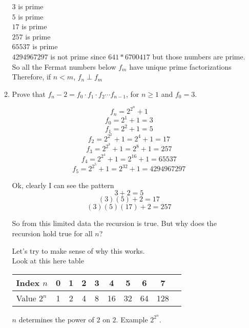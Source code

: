 \documentclass[10pt, AMS Euler]{article}
\begin{document}
\begin{enumerate}
\begin{enumerate}
                $3$ is prime \\
                $5$ is prime \\
                $17$ is prime \\
                $257$ is prime \\
                $65537$ is prime \\
                $4294967297$ is not prime since $641 * 6700417$ but those numbers are prime. \\

                So all the Fermat numbers below $f_m$ have unique prime factorizations \\

                Therefore, if $n < m$, $f_n \perp f_m$ \\

			\item Prove that $f_n - 2 = f_0\cdot f_1 \cdot f_2 \cdots f_{n-1}$, for $n \geq 1$ and  $f_0 = 3$.

                $$ f_n = 2^{2^n}+1 $$
                $$ f_0 = 2^{1} + 1 = 3 $$
                $$ f_1 = 2^{2} + 1 = 5 $$
                $$ f_2 = 2^{2^2} + 1 = 2^4 + 1 = 17 $$
                $$ f_3 = 2^{2^3} + 1 = 2^8 + 1 = 257 $$
                $$ f_4 = 2^{2^4} + 1 = 2^{16} + 1 = 65537 $$
                $$ f_5 = 2^{2^5} + 1 = 2^{32} + 1 = 4294967297 $$

                Ok, clearly I can see the pattern
                $$ 3 + 2 = 5 $$
                $$ (3)(5) + 2 = 17 $$
                $$ (3)(5)(17) + 2 = 257 $$

                So from this limited data the recursion is true. But why does the recursion hold true for all $n$?

                Let's try to make sense of why this works. \\
                
                Look at this here table
            \begin{center}
                \begin{tabular}{l|ccccccccc}
                    {\bf Index $n$ } & 0 & 1 & 2 & 3 & 4 & 5 & 6 & 7  \\
                    \hline
                    {Value $2^n$} & 1 & 2 & 4 & 8 & 16 & 32 & 64 & 128   \\
                \end{tabular}
            \end{center}

            $n$ determines the power of $2$ on $2$. Example $2^{2^n}$. \\


\end{enumerate}
\end{enumerate}
\end{document}
